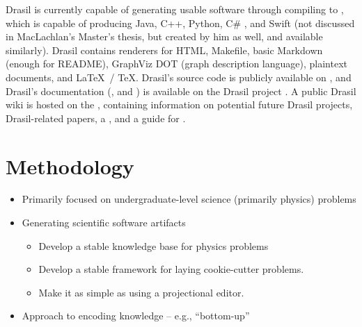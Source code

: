 Drasil is currently capable of generating usable software through compiling to
, which is capable of producing Java, C++, Python, C\#
\cite{MacLachlan2020}, and Swift (not discussed in MacLachlan's Master's thesis,
but created by him as well, and available similarly). Drasil contains renderers
for HTML, Makefile, basic Markdown (enough for README), GraphViz DOT (graph
description language), plaintext documents, and \LaTeX\ / \TeX. Drasil's source
code is publicly available on
, and Drasil's
documentation
(,
and
)
is available on the Drasil project
. A public Drasil
wiki is hosted on the , containing information
on potential future Drasil projects, Drasil-related papers, a
, and a
guide for .

\section{Methodology}

\begin{itemize}

      \item Primarily focused on undergraduate-level science (primarily physics)
            problems

      \item Generating scientific software artifacts
            \begin{itemize}
                  \item Develop a stable knowledge base for physics problems

                  \item Develop a stable framework for laying cookie-cutter
                        problems.

                  \item Make it as simple as using a projectional editor.

            \end{itemize}

      \item Approach to encoding knowledge -- e.g., ``bottom-up''

\end{itemize}

